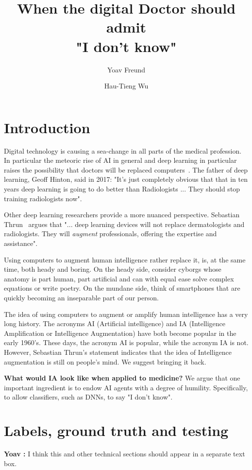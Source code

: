 \documentclass[9pt,twocolumn,twoside]{pnas-new}
\title{When the digital Doctor should admit\\ "I don't know"}
\author[1]{Yoav Freund}
\author[2]{Hau-Tieng Wu}
\affil[1]{UCSD, department, city, postcode, country}
\affil[2]{Duke, department, city, postcode, country}
\newcommand{\comment}[3]{{\color{#1} {\bf #2 :} #3}}
\newcommand{\yoav}[1]{\comment{red}{Yoav}{#1}}
\begin{document}
\maketitle

\thispagestyle{firststyle}
  
\section*{Introduction}

Digital technology is causing a sea-change in all parts of the medical
profession. In particular the meteoric rise of AI in general and deep
learning in particular raises the possibility that doctors will be
replaced computers~\cite{Mukherjee2017}. The father of deep learning,
Geoff Hinton, said in 2017: "It's just completely obvious that that in
ten years deep learning is going to do better than Radiologists
... They should stop training radiologists now".

Other deep learning researchers provide a more nuanced
perspective. Sebastian
Thrun~\cite{Mukherjee2017,esteva2017dermatologist} argues that
"... deep learning devices will not replace dermatologists and
radiologists. They will {\em augment} professionals, offering the
expertise and assistance".

Using computers to augment human intelligence rather replace it, is,
at the same time, both heady and boring. On the heady side, consider
cyborgs whose anatomy is part human, part artificial and can with
equal ease solve complex equations or write poetry. On the mundane
side, think of smartphones that are quickly becoming an inseparable
part of our person.
 
The idea of using computers to augment or amplify human intelligence
has a very long history. The acronyms AI (Artificial intelligence) and
IA (Intelligence Amplification or Intelligence Augmentation) have both
become popular in the early
1960's\cite{ashby1957introduction,engelbart1962augmenting}. These
days, the acronym AI is popular, while the acronym IA is not. However,
Sebastian Thrun's statement indicates that the idea of Intelligence
augmentation is still on people's mind. We suggest bringing it back.

{\bf What would IA look like when applied to medicine?} We argue that
one important ingredient is to endow AI agents with a degree of
humility. Specifically, to allow classifiers, such as DNNs, to say "I
don't know".


\section*{Labels, ground truth and testing}
\yoav{I think this and other technical sections should appear in a
  separate text box.}
\end{document}
